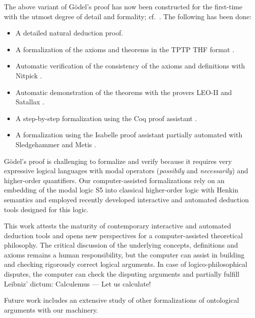 \documentclass{llncs}
\begin{document}
The above variant of G\"{o}del's proof has now been 
constructed for the first-time
with the utmost degree of detail and formality; cf.~\cite{ToDo:GitHubRepository}. The following has been done:
\begin{itemize}
\item A detailed natural deduction proof.
%
\item A formalization of the axioms and theorems in the TPTP THF format \cite{J22}.
%
\item Automatic verification of the consistency of the axioms and 
definitions with Nitpick \cite{Nitpick}.
%
\item Automatic demonstration of the theorems with the provers LEO-II \cite{LEO-II} and Satallax \cite{Satallax}.

\item A step-by-step formalization using the Coq proof assistant \cite{ToDo}.

\item A formalization using the Isabelle proof assistant \cite{Isabelle} partially automated with Sledgehammer \cite{ToDo} and Metis \cite{ToDo}.
\end{itemize}

G\"{o}del's proof is challenging to formalize and verify 
because it requires very expressive logical languages with 
modal operators (\emph{possibily} and \emph{necessarily}) and higher-order quantifiers. 
Our computer-assisted formalizations rely on an embedding of the modal logic S5 
into classical higher-order logic with Henkin 
semantics \cite{J23} and 
employed recently developed interactive and automated deduction tools designed for this logic.

This work attests the maturity of contemporary interactive and
automated deduction tools and opens new perspectives for a
computer-assisted theoretical philosophy.  
The critical discussion of the underlying concepts, definitions and
axioms remains a human responsibility, but the computer can assist in
building and checking rigorously correct logical arguments. In case of
logico-philosophical disputes, the computer can check the disputing
arguments and partially fulfill Leibniz' dictum: Calculemus --- Let us
calculate!

Future work includes an
extensive study of other formalizations of ontological arguments with
our machinery.



\end{document}
